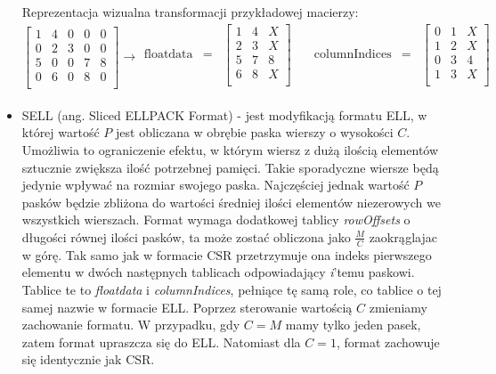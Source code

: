 \begin{itemize}
    Reprezentacja wizualna transformacji przykładowej macierzy:
    \[
\left[
\begin{array}{ccccc}
    1 & 4 & 0 & 0 & 0\\ 
    0 & 2 & 3 & 0 & 0\\ 
    5 & 0 & 0 & 7 & 8\\ 
    0 & 6 & 0 & 8 & 0\\ 
\end{array}
\right]
\rightarrow
\begin{matrix}
\text{floatdata} & = & \begin{bmatrix}
1 & 4 & X \\
2 & 3 & X \\
5 & 7 & 8 \\
6 & 8 & X \\
\end{bmatrix} \\
\end{matrix}
\quad
\begin{matrix}
\text{columnIndices} & = & \begin{bmatrix}
0 & 1 & X \\
1 & 2 & X \\
0 & 3 & 4 \\
1 & 3 & X \\
\end{bmatrix} \\
\end{matrix}
\]
    
    \item SELL (ang. Sliced ELLPACK Format) - jest modyfikacją formatu ELL, w której wartość $P$ jest obliczana w obrębie paska wierszy o wysokości $C$.
    Umożliwia to ograniczenie efektu, w którym wiersz z dużą ilością elementów sztucznie zwiększa ilość potrzebnej pamięci.
    Takie sporadyczne wiersze będą jedynie wpływać na rozmiar swojego paska.
    Najczęściej jednak wartość $P$ pasków będzie zbliżona do wartości średniej ilości elementów niezerowych we wszystkich wierszach.
    Format wymaga dodatkowej tablicy \textit{rowOffsets} o długości równej ilości pasków, ta może zostać obliczona jako $\frac{M}{C}$ zaokrąglajac w górę.
    Tak samo jak w formacie CSR przetrzymuje ona indeks pierwszego elementu w dwóch następnych tablicach odpowiadający \textit{i}'temu paskowi.
    Tablice te to \textit{floatdata} i \textit{columnIndices}, pełniące tę samą role, co tablice o tej samej nazwie w formacie ELL.
    Poprzez sterowanie wartością $C$ zmieniamy zachowanie formatu.
    W przypadku, gdy $C = M$ mamy tylko jeden pasek, zatem format upraszcza się do ELL.
    Natomiast dla $C = 1$, format zachowuje się identycznie jak CSR.
    

\end{itemize}
